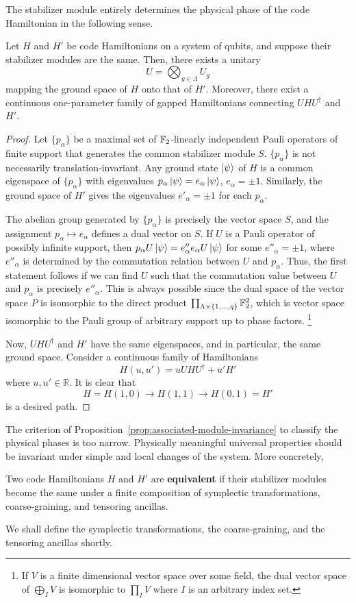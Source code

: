 The stabilizer module entirely determines
the physical phase of the code Hamiltonian
in the following sense.
\begin{prop}
Let $H$ and $H'$ be code Hamiltonians on a system of qubits,
and suppose their stabilizer modules are the same.
Then, there exists a unitary
\[
 U = \bigotimes_{g \in \Lambda} U_{g}
\]
mapping the ground space of $H$ onto that of $H'$.
Moreover, there exist a continuous one-parameter family of gapped Hamiltonians
connecting $U H U^\dagger$ and $H'$.
\label{prop:associated-module-invariance}
\end{prop}
\begin{proof}
Let $\{ p_\alpha \}$ be a maximal set of $\mathbb{F}_2$-linearly independent Pauli operators of finite support
that generates the common stabilizer module $S$.
$\{p_\alpha\}$ is not necessarily translation-invariant.
Any ground state $\left| {\psi} \right\rangle$ of $H$ is a common eigenspace of $\{p_\alpha\}$
with eigenvalues $p_\alpha \left| {\psi} \right\rangle = e_\alpha \left| {\psi} \right\rangle$, $e_\alpha = \pm 1$.
Similarly, the ground space of $H'$ gives the eigenvalues $e'_\alpha = \pm 1$ for each $p_\alpha$.

The abelian group generated by $\{ p_\alpha \}$ is precisely the vector space $S$,
and the assignment $p_\alpha \mapsto e_\alpha$ defines a dual vector on $S$.
If $U$ is a Pauli operator of possibly infinite support,
then $ p_\alpha U \left| {\psi} \right\rangle = e''_\alpha e_\alpha U \left| {\psi} \right\rangle$ for some $e''_\alpha = \pm 1$,
where $e''_\alpha$ is determined by the commutation relation between $U$ and $p_\alpha$.
Thus, the first statement follows if we can find $U$
such that the commutation value between $U$ and $p_\alpha$ is precisely $e''_\alpha$.
This is always possible since the dual space of the vector space $P$
is isomorphic to the direct product $\prod _{\Lambda \times \{1,\ldots, q\}} \mathbb{F}_2^2$,
which is vector space isomorphic to the Pauli group of arbitrary support up to phase factors.%
\footnote{{If $V$ is a finite dimensional vector space over some field,
the dual vector space of $\bigoplus_I V$ 
is isomorphic to $\prod_{I} V$ where $I$ is an arbitrary index set.}}

Now, $U H U^\dagger$ and $H'$ have the same eigenspaces, and in particular, the same ground space.
Consider a continuous family of Hamiltonians
\[
H(u,u') = u U H U^\dagger + u' H'
\]
where $u,u' \in \mathbb{R}$.
It is clear that
\[
 H = H(1,0) \to H(1,1) \to H(0,1) = H'
\]
is a desired path.
\end{proof}

The criterion of Proposition~\ref{prop:associated-module-invariance}
to classify the physical phases is too narrow.
Physically meaningful universal properties should be invariant
under simple and local changes of the system. More concretely,
\begin{defn}
Two code Hamiltonians $H$ and $H'$ are {\bf equivalent} if
their stabilizer modules become the same under a finite composition
of symplectic transformations, coarse-graining, and tensoring ancillas.
\label{defn:equiv-H}
\end{defn}
We shall define the symplectic transformations,
the coarse-graining, and the tensoring ancillas shortly.


